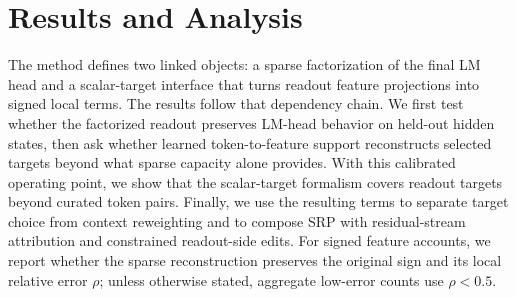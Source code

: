 \section{Results and Analysis}
\label{sec:results}

The method defines two linked objects: a sparse factorization of the final LM
head and a scalar-target interface that turns readout feature projections into
signed local terms. The results follow that dependency chain. We first test
whether the factorized readout preserves LM-head behavior on held-out hidden
states, then ask whether learned token-to-feature support reconstructs selected
targets beyond what sparse capacity alone provides. With this calibrated
operating point, we show that the scalar-target formalism covers readout
targets beyond curated token pairs. Finally, we use the resulting terms to
separate target choice from context reweighting and to compose SRP with
residual-stream attribution and constrained readout-side edits. For signed
feature accounts, we report whether the sparse reconstruction preserves the
original sign and its local relative error \(\rho\); unless otherwise stated,
aggregate low-error counts use \(\rho<0.5\).

